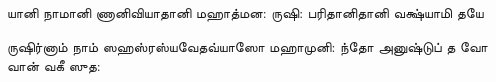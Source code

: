 \documentclass[10pt]{article}
\begin{document}
{\newpage
\slokasl
{யானி நாமானி ணானி}{வியாதானி மஹாத்மன:}
{ருஷி: பரிதானி}{தானி வக்ஷ்யாமி தயே}

\slokasl
{ருஷிர்‌னாம்‌ நாம் ஸஹஸ்ரஸ்ய}{வேதவ்யாஸோ மஹாமுனி:}
{ந்தோ \dash அனுஷ்டுப்‌ த வோ} {வான்‌ வகீ ஸுத:}









}
\end{document}
